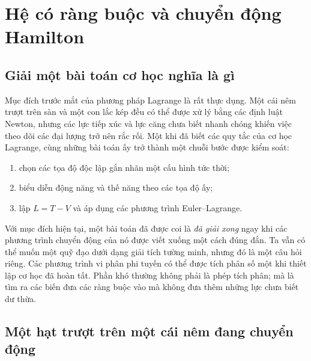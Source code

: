\chapter{Hệ có ràng buộc và chuyển động Hamilton}


\section{Giải một bài toán cơ học nghĩa là gì}

Mục đích trước mắt của phương pháp Lagrange là rất thực dụng. Một cái nêm trượt trên sàn và một con lắc kép đều có thể được xử lý bằng các định luật Newton, nhưng các lực tiếp xúc và lực căng chưa biết nhanh chóng khiến việc theo dõi các đại lượng trở nên rắc rối. Một khi đã biết các quy tắc của cơ học Lagrange, cùng những bài toán ấy trở thành một chuỗi bước được kiểm soát:
\begin{enumerate}
  \item chọn các tọa độ độc lập gắn nhãn một cấu hình tức thời;
  \item biểu diễn động năng và thế năng theo các tọa độ ấy;
  \item lập \(L=T-V\) và áp dụng các phương trình Euler--Lagrange.
\end{enumerate}

Với mục đích hiện tại, một bài toán đã được coi là \emph{đã giải xong} ngay khi các phương trình chuyển động của nó được viết xuống một cách đúng đắn. Ta vẫn có thể muốn một quỹ đạo dưới dạng giải tích tường minh, nhưng đó là một câu hỏi riêng. Các phương trình vi phân phi tuyến có thể được tích phân số một khi thiết lập cơ học đã hoàn tất. Phần khó thường không phải là phép tích phân; mà là tìm ra các biến đưa các ràng buộc vào mà không đưa thêm những lực chưa biết dư thừa.

\section{Một hạt trượt trên một cái nêm đang chuyển động}

